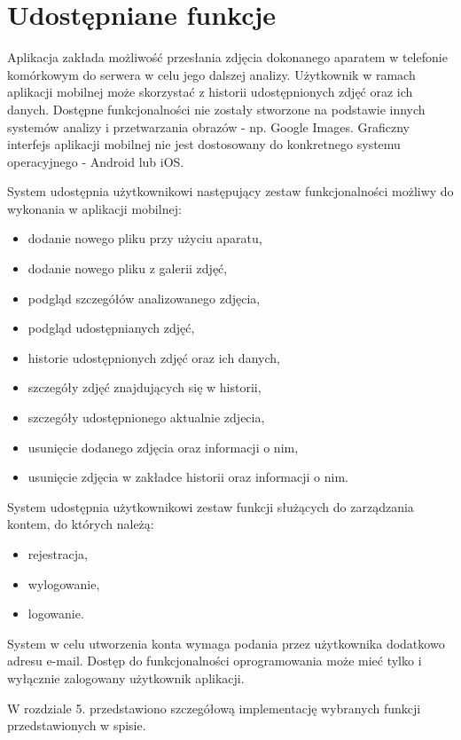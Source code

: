 \section{Udostępniane funkcje}
Aplikacja zakłada możliwość przesłania zdjęcia dokonanego aparatem w telefonie komórkowym do serwera w celu jego dalszej analizy. Użytkownik w ramach aplikacji mobilnej może skorzystać z historii udostępnionych zdjęć oraz ich danych. Dostępne funkcjonalności nie zostały stworzone na podstawie innych systemów analizy i przetwarzania obrazów - np. Google Images. Graficzny interfejs aplikacji mobilnej nie jest dostosowany do konkretnego systemu operacyjnego - Android lub iOS. 

System udostępnia użytkownikowi następujący zestaw funkcjonalności możliwy do wykonania w aplikacji mobilnej:
\begin{itemize}[align=left]

	\item dodanie nowego pliku przy użyciu aparatu,
	\item dodanie nowego pliku z galerii zdjęć,
	\item podgląd szczegółów analizowanego zdjęcia,
	\item podgląd udostępnianych zdjęć,
	\item historie udostępnionych zdjęć oraz ich danych,
	\item szczegóły zdjęć znajdujących się w historii,
	\item szczegóły udostępnionego aktualnie zdjecia,
	\item usunięcie dodanego zdjęcia oraz informacji o nim,
	\item usunięcie zdjęcia w zakładce historii oraz informacji o nim.
	
\end{itemize}

System udostępnia użytkownikowi zestaw funkcji służących do zarządzania kontem, do których należą:
\begin{itemize}[align=left]
	\item rejestracja,
	\item wylogowanie,	
	\item logowanie.
\end{itemize}

System w celu utworzenia konta wymaga podania przez użytkownika dodatkowo adresu e-mail. Dostęp do funkcjonalności oprogramowania może mieć tylko i wyłącznie zalogowany użytkownik aplikacji. 

W rozdziale 5. przedstawiono szczegółową implementację wybranych funkcji przedstawionych w spisie.